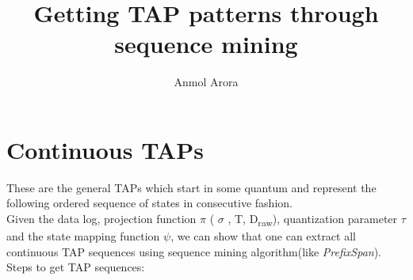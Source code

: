 \documentclass{article}
\title{Getting TAP patterns through sequence mining}
\author{Anmol Arora}
\begin{document}
\maketitle

\section{Continuous TAPs}
These are the general TAPs which start in some quantum and represent the following ordered sequence of states in consecutive fashion.\\
Given the data log, projection function $\pi$ ( $\sigma$ , T, D\textsubscript{raw}), quantization parameter $\tau$ and the state mapping function $\psi$, we can show that one can extract all continuous TAP sequences using sequence mining algorithm(like \textit{PrefixSpan}).\\
Steps to get TAP sequences:\\
\end{document}
